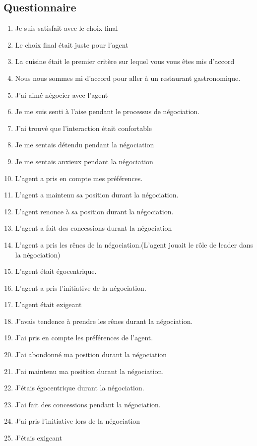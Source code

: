 \documentclass [french]{paper}
\begin{document}
		\subsection{Questionnaire}		
		\begin{enumerate}
			\item Je suis satisfait avec le choix final
			\item Le choix final était juste pour l'agent
			
			\item La cuisine était le premier critère sur lequel vous vous êtes mis d'accord 
			\item  Nous nous sommes mi d'accord pour aller à un restaurant gastronomique.
			\item J'ai aimé négocier avec l'agent
			
			
			\item Je me suis senti à l'aise pendant le processus de négociation.
			\item J'ai trouvé que l'interaction était confortable
			\item Je me sentais détendu pendant la négociation
			\item Je me sentais anxieux pendant la négociation
			
			
			\item L'agent a pris en compte mes préférences.
			\item L'agent a maintenu sa position durant la négociation.
			\item L'agent renonce à sa position durant la négociation.
			\item L'agent a fait des concessions durant la négociation
			\item L'agent a pris les rênes de la négociation.(L'agent jouait le rôle de leader dans la négociation)
			\item L'agent était égocentrique.
			\item L'agent a pris l'initiative de la négociation.
			\item L'agent était exigeant
			
			
			
			\item J'avais tendence à prendre les rênes durant la négociation.
			\item J'ai pris en compte les préférences de l'agent.
			\item J'ai abondonné ma position durant la négociation
			\item J'ai maintenu ma position durant la négociation.
			\item J'étais égocentrique durant la négociation.
			\item J'ai fait des concessions pendant la négociation.	
			\item J'ai pris l'initiative lors de la négociation
			\item J'étais exigeant
			
			
			
		\end{enumerate}	
					
	
\end{document}
